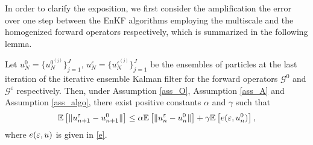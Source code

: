 In order to clarify the exposition, we first consider the amplification the error over one step between the EnKF algorithms employing the multiscale and the homogenized forward operators respectively, which is summarized in the following lemma.
\begin{lemma} \label{convergence_local} Let $u_{N}^0 = \{ u_{N}^{0^{(j)}} \}_{j=1}^J$, $u_N^{\varepsilon} = \{ u_N^{\varepsilon^{(j)}} \}_{j=1}^J$ be the ensembles of particles at the last iteration of the iterative ensemble Kalman filter for the forward operators $\mathcal{G}^0$ and $\mathcal{G}^{\varepsilon}$ respectively. Then, under Assumption \ref{ass_O}, Assumption \ref{ass_A} and Assumption \ref{ass_algo},	there exist positive constants $\alpha$ and $\gamma$ such that
\begin{equation}
\mathbb{E} \left [ \lVert u_{n+1}^{\varepsilon} - u_{n+1}^0\rVert \right ] \le \alpha \mathbb{E} \left [ \lVert u_n^{\varepsilon} - u_n^0\rVert \right ] + \gamma \mathbb{E} \left [ e(\varepsilon, u_n^0) \right ],
\end{equation}
where $e(\varepsilon, u)$ is given in \eqref{e}.
\end{lemma}
